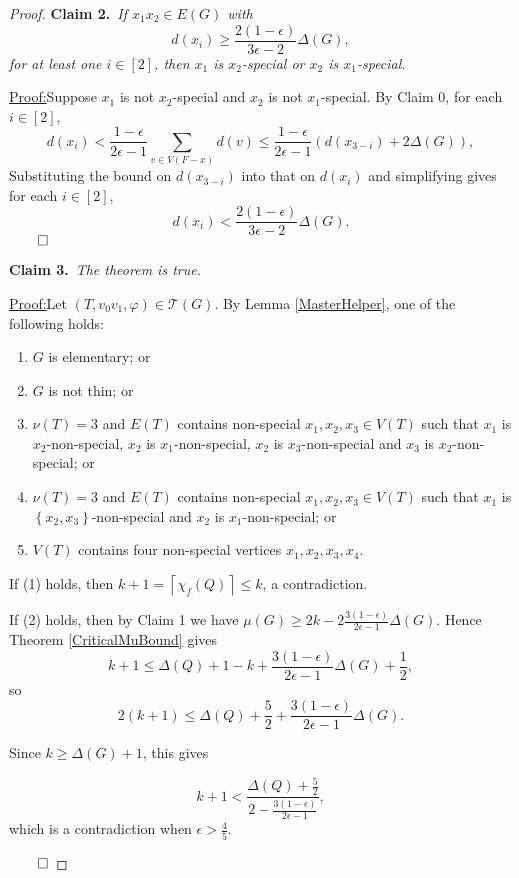\documentclass[12pt]{amsart}
\theoremstyle{plain}
\theoremstyle{definition}
\theoremstyle{remark}
\newcommand{\fancy}[1]{\mathcal{#1}}
\newcommand{\T}{\fancy{T}}
\newcommand{\set}[1]{\left\{ #1 \right\}}
\newcommand{\ceil}[1]{\left\lceil#1\right\rceil}
\newcommand{\irange}[1]{\left[#1\right]}
\newcommand{\parens}[1]{\left( #1 \right)}
\newcommand{\vph}{\varphi}
\newcommand{\claim}[2]{{\noindent\bf Claim #1.}~{\it #2}~~}
\newenvironment{claimproof}[1]{\par\noindent\underline{Proof:}\space#1}{\leavevmode\unskip\penalty9999
\hbox{}\nobreak\hfill\quad\hbox{$\qed$}}
\begin{document}
\begin{proof}
\claim{2}{If $x_1x_2 \in E(G)$ with \[d(x_i) \ge \frac{2(1-\epsilon)}{3\epsilon - 2}\Delta(G),\] for at least one $i \in \irange{2}$, then $x_1$ is $x_2$-special or $x_2$ is $x_1$-special.}

\begin{claimproof}
Suppose $x_1$ is not $x_2$-special and $x_2$ is not $x_1$-special.  By Claim 0,
for each $i \in \irange{2}$,
\[d(x_i) < \frac{1-\epsilon}{2\epsilon -1}\sum_{v \in V(F-x)} d(v) \le
\frac{1-\epsilon}{2\epsilon -1}\parens{d(x_{3-i}) + 2\Delta(G)},\]
Substituting the bound on $d(x_{3-i})$ into that on $d(x_i)$ and simplifying
gives for each $i \in \irange{2}$,
\[d(x_i) < \frac{2(1-\epsilon)}{3\epsilon - 2}\Delta(G).\]
\end{claimproof}

\bigskip

\claim{3}{The theorem is true.}

\begin{claimproof}
Let $(T, v_0v_1, \vph) \in \T(G)$. By Lemma \ref{MasterHelper}, one of the following holds:
\begin{enumerate}
\item $G$ is elementary; or
\item $G$ is not thin; or
\item $\nu(T) = 3$ and $E(T)$ contains non-special $x_1,x_2,x_3 \in V(T)$ such that $x_1$ is $x_2$-non-special, $x_2$ is $x_1$-non-special, $x_2$ is $x_3$-non-special and $x_3$ is $x_2$-non-special; or
\item $\nu(T) = 3$ and $E(T)$ contains non-special $x_1,x_2,x_3 \in V(T)$ such that $x_1$ is $\set{x_2,x_3}$-non-special and $x_2$ is $x_1$-non-special; or
\item $V(T)$ contains four non-special vertices $x_1, x_2, x_3, x_4$.
\end{enumerate}

If (1) holds, then $k + 1 = \ceil{\chi_f(Q)} \le k$, a contradiction.

If (2) holds, then by Claim 1 we have $\mu(G) \ge 2k - 2\frac{3(1-\epsilon)}{2\epsilon -1}\Delta(G)$.  Hence Theorem \ref{CriticalMuBound} gives
\[k + 1 \le \Delta(Q) + 1 - k + \frac{3(1-\epsilon)}{2\epsilon -1}\Delta(G) + \frac12,\]
so
\[2(k + 1) \le \Delta(Q) + \frac52 + \frac{3(1-\epsilon)}{2\epsilon -1}\Delta(G).\]

Since $k \ge \Delta(G) + 1$, this gives

\[k + 1 < \frac{\Delta(Q) + \frac52}{2 - \frac{3(1-\epsilon)}{2\epsilon -1}},\]
which is a contradiction when $\epsilon > \frac45$.


\end{claimproof}
\end{proof}
\end{document}
